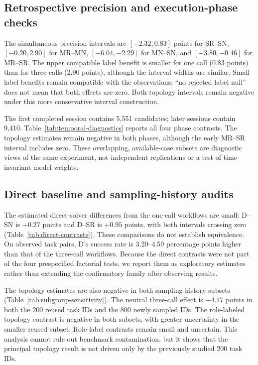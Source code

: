 


\subsection{Retrospective precision and execution-phase checks}
The simultaneous precision intervals are $[-2.32,0.83]$ points for SR--SN, $[-0.20,2.90]$ for MR--MN, $[-6.04,-2.29]$ for MN--SN, and $[-3.80,-0.46]$ for MR--SR. The upper compatible label benefit is smaller for one call (0.83 points) than for three calls (2.90 points), although the interval widths are similar. Small label benefits remain compatible with the observations; ``no rejected label null'' does not mean that both effects are zero. Both topology intervals remain negative under this more conservative interval construction.

The first completed session contains 5,551 candidates; later sessions contain 9,410. Table~\ref{tab:temporal-diagnostics} reports all four phase contrasts. The topology estimates remain negative in both phases, although the early MR--SR interval includes zero. These overlapping, available-case subsets are diagnostic views of the same experiment, not independent replications or a test of time-invariant model weights.



\subsection{Direct baseline and sampling-history audits}
The estimated direct-solver differences from the one-call workflows are small: D--SN is $+0.27$ points and D--SR is $+0.95$ points, with both intervals crossing zero (Table~\ref{tab:direct-contrasts}). These comparisons do not establish equivalence. On observed task pairs, D's success rate is 3.20--4.59 percentage points higher than that of the three-call workflows. Because the direct contrasts were not part of the four prespecified factorial tests, we report them as exploratory estimates rather than extending the confirmatory family after observing results.



The topology estimates are also negative in both sampling-history subsets (Table~\ref{tab:subgroup-sensitivity}). The neutral three-call effect is $-4.17$ points in both the 200 reused task IDs and the 800 newly sampled IDs. The role-labeled topology contrast is negative in both subsets, with greater uncertainty in the smaller reused subset. Role-label contrasts remain small and uncertain. This analysis cannot rule out benchmark contamination, but it shows that the principal topology result is not driven only by the previously studied 200 task IDs.


